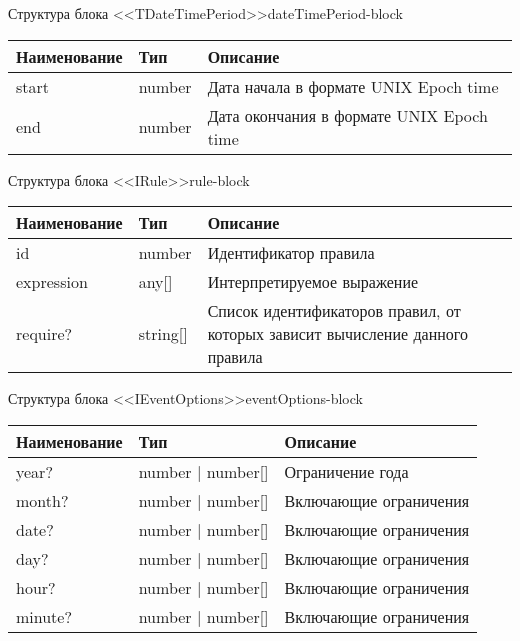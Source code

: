  \hypertarget{app:B}{\label{app:B}}


\begin{tblh}{Структура блока <<TDateTimePeriod>>}{dateTimePeriod-block}
  \begin{tabularx}{\textwidth}{| p{3cm} | p{6cm} | X |}
  \hline Наименование & Тип    & Описание                                 \\
  \hline start        & number & Дата начала в формате UNIX Epoch time    \\
  \hline end          & number & Дата окончания в формате UNIX Epoch time \\
  \hline
  \end{tabularx}
\end{tblh}

\begin{tblh}{Структура блока <<IRule>>}{rule-block}
  \begin{tabularx}{\textwidth}{| p{3cm} | p{6cm} | X |}
  \hline Наименование & Тип      & Описание                                                                     \\
  \hline id           & number   & Идентификатор правила                                                        \\
  \hline expression   & any[]    & Интерпретируемое выражение                                                   \\
  \hline require?     & string[] & Список идентификаторов правил, от которых зависит вычисление данного правила \\
  \hline
  \end{tabularx}
\end{tblh}

\begin{tblh}{Структура блока <<IEventOptions>>}{eventOptions-block}
  \begin{tabularx}{\textwidth}{| p{3cm} | p{6cm} | X |}
  \hline Наименование    & Тип               & Описание               \\
  \hline year?           & number | number[] & Ограничение года       \\
  \hline month?          & number | number[] & Включающие ограничения \\
  \hline date?           & number | number[] & Включающие ограничения \\
  \hline day?            & number | number[] & Включающие ограничения \\
  \hline hour?           & number | number[] & Включающие ограничения \\
  \hline minute?         & number | number[] & Включающие ограничения \\
  \hline
  \end{tabularx}
\end{tblh}

